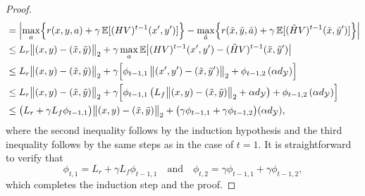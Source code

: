 \documentclass[11pt, notitlepage]{article}
\newcommand{\E}{\mathbb{E}}
\newcommand{\1}{\mathbbm{1}}
\begin{document}
\begin{proof}
\begin{align*}
    &= \Bigl| \max_{a} \Bigl \{ r(x,y, a) + \gamma \, \E [ (HV)^{t-1} (x',y')] \Bigr \} - \max_{\tilde{a}} \Bigl \{ r(\tilde{x},\tilde{y},\tilde{a}) + \gamma \, \E [ (\tilde{H}V)^{t-1} (\tilde{x}, \tilde{y}')]\Bigr \} \Bigr| \nonumber\\
    &\le  L_r \bigl \|(x, y) - (\tilde{x}, \tilde{y}) \bigr\|_2 + \gamma \max_{a}  \mathbb{E} \bigl | (HV)^{t-1}(x', y') - (\tilde{H}V)^{t-1}(\tilde{x}, \tilde{y}')  \bigr|\\
    &\le  L_r \bigl \|(x, y) - (\tilde{x}, \tilde{y}) \bigr\|_2 + \gamma 
    \Bigl[ \phi_{t-1, 1} \, \bigl\|(x',y')-(\tilde{x}, \tilde{y}') \bigr \|_2 + \phi_{t-1, 2} \, (\alpha d_\mathcal{Y}) \Bigr]\\
    &\le  L_r \bigl \|(x, y) - (\tilde{x}, \tilde{y}) \bigr\|_2 + \gamma 
    \Bigl[ \phi_{t-1, 1} \, \bigl(L_f \bigl \| (x, y) - (\tilde{x}, \tilde{y}) \bigr\|_2 + \alpha d_\mathcal{Y}  \bigr) + \phi_{t-1, 2} \, (\alpha d_\mathcal{Y}) \Bigr]\\
    &\le \bigl(L_r + \gamma L_f \phi_{t-1, 1} \bigr) \bigl \|(x, y) - (\tilde{x}, \tilde{y}) \bigr\|_2 +  \bigl(\gamma\phi_{t-1, 1} + \gamma \phi_{t-1, 2}\bigr)(\alpha d_\mathcal{Y}),
\end{align*}
where the second inequality follows by the induction hypothesis and the third inequality follows by the same steps as in the case of $t=1$. It is straightforward to verify that
\[
\phi_{t, 1} = L_r + \gamma L_f \phi_{t-1, 1} \quad \text{and} \quad \phi_{t, 2} = \gamma\phi_{t-1, 1} + \gamma \phi_{t-1, 2},
\]
which completes the induction step and the proof.
\end{proof}
\end{document}
